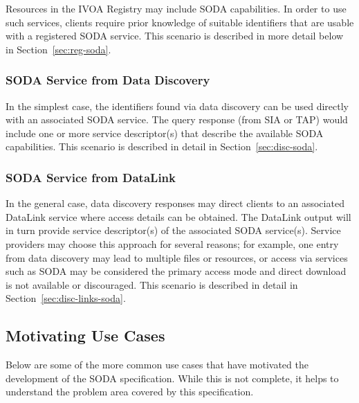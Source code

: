 \documentclass[11pt,a4paper]{ivoa}
\begin{document}
Resources in the IVOA Registry may include SODA capabilities. In order to
use such services, clients require prior knowledge of suitable
identifiers that are usable with a registered SODA service. This
scenario is described in more detail below in
Section~\ref{sec:reg-soda}.

\subsubsection{SODA Service from Data Discovery}

In the simplest case, the identifiers found via data discovery can be
used directly with an associated SODA service. The query response (from
SIA or TAP) would include one or more service descriptor(s)
that describe the available SODA capabilities. This scenario is described
in detail in Section~\ref{sec:disc-soda}.

\subsubsection{SODA Service from DataLink}

In the general case, data discovery responses may direct clients to an
associated DataLink service where access details can be obtained. The
DataLink output will in turn provide service descriptor(s) of the
associated SODA service(s). Service providers may choose this approach
for several reasons; for example, one entry from data discovery may lead
to multiple files or resources, or access via services such as SODA may
be considered the primary access mode and direct download is not
available or discouraged. This scenario is described in detail in
Section~\ref{sec:disc-links-soda}.


\subsection{Motivating Use Cases}
Below are some of the more common use cases that have motivated the
development of the SODA specification. While this is not complete, it
helps to understand the problem area covered by this specification.
\end{document}
